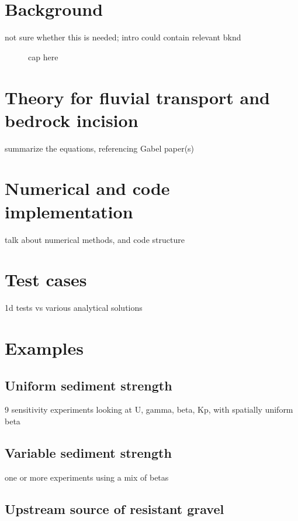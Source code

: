 \documentclass[journal abbreviation, manuscript]{copernicus}
\begin{document}
\section{Background}
\label{sec:background}

not sure whether this is needed; intro could contain relevant bknd

\begin{figure}[h!]
\centering
\caption{cap here}
\label{fig:somefig}
\end{figure}



\section{Theory for fluvial transport and bedrock incision}

summarize the equations, referencing Gabel paper(s)

\section{Numerical and code implementation}

talk about numerical methods, and code structure

\section{Test cases}

1d tests vs various analytical solutions

\section{Examples}

\subsection{Uniform sediment strength}

9 sensitivity experiments looking at U, gamma, beta, Kp, with spatially uniform beta

\subsection{Variable sediment strength}

one or more experiments using a mix of betas

\subsection{Upstream source of resistant gravel}
\end{document}
